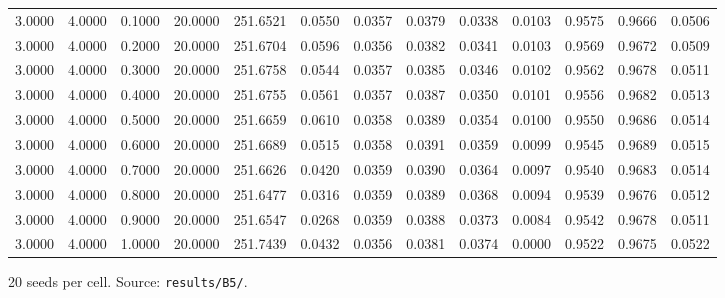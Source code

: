 \begin{table}[htbp]
\begin{tabular}{lrrrrrrrrrrrr}
3.0000 & 4.0000 & 0.1000 & 20.0000 & 251.6521 & 0.0550 & 0.0357 & 0.0379 & 0.0338 & 0.0103 & 0.9575 & 0.9666 & 0.0506 \\
3.0000 & 4.0000 & 0.2000 & 20.0000 & 251.6704 & 0.0596 & 0.0356 & 0.0382 & 0.0341 & 0.0103 & 0.9569 & 0.9672 & 0.0509 \\
3.0000 & 4.0000 & 0.3000 & 20.0000 & 251.6758 & 0.0544 & 0.0357 & 0.0385 & 0.0346 & 0.0102 & 0.9562 & 0.9678 & 0.0511 \\
3.0000 & 4.0000 & 0.4000 & 20.0000 & 251.6755 & 0.0561 & 0.0357 & 0.0387 & 0.0350 & 0.0101 & 0.9556 & 0.9682 & 0.0513 \\
3.0000 & 4.0000 & 0.5000 & 20.0000 & 251.6659 & 0.0610 & 0.0358 & 0.0389 & 0.0354 & 0.0100 & 0.9550 & 0.9686 & 0.0514 \\
3.0000 & 4.0000 & 0.6000 & 20.0000 & 251.6689 & 0.0515 & 0.0358 & 0.0391 & 0.0359 & 0.0099 & 0.9545 & 0.9689 & 0.0515 \\
3.0000 & 4.0000 & 0.7000 & 20.0000 & 251.6626 & 0.0420 & 0.0359 & 0.0390 & 0.0364 & 0.0097 & 0.9540 & 0.9683 & 0.0514 \\
3.0000 & 4.0000 & 0.8000 & 20.0000 & 251.6477 & 0.0316 & 0.0359 & 0.0389 & 0.0368 & 0.0094 & 0.9539 & 0.9676 & 0.0512 \\
3.0000 & 4.0000 & 0.9000 & 20.0000 & 251.6547 & 0.0268 & 0.0359 & 0.0388 & 0.0373 & 0.0084 & 0.9542 & 0.9678 & 0.0511 \\
3.0000 & 4.0000 & 1.0000 & 20.0000 & 251.7439 & 0.0432 & 0.0356 & 0.0381 & 0.0374 & 0.0000 & 0.9522 & 0.9675 & 0.0522 \\
\bottomrule
\end{tabular}
\par\smallskip
\begin{minipage}{\linewidth}\footnotesize 20 seeds per cell. Source: \texttt{results/B5/}.\end{minipage}
\end{table}
